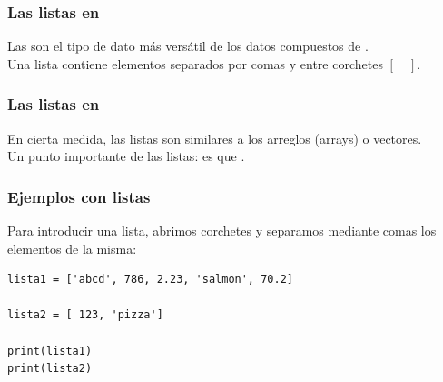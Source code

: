 \documentclass[12pt]{beamer}
\begin{document}
\begin{frame}
\frametitle{Las listas en \python}
Las  son el tipo de dato más versátil de los datos compuestos de \python.
\\
\bigskip
Una lista contiene elementos separados por comas y entre corchetes $[ \quad ]$.
\end{frame}
\begin{frame}
\frametitle{Las listas en \python}
En cierta medida, las listas son similares a los arreglos (arrays) o vectores.
\\
\bigskip
Un punto importante de las listas: \pause es que .
\end{frame}
\begin{frame}[fragile]
\frametitle{Ejemplos con listas}
Para introducir una lista, abrimos corchetes y separamos mediante comas los elementos de la misma:
\pause
\begin{lstlisting}[caption=Definiendo dos listas]
lista1 = ['abcd', 786, 2.23, 'salmon', 70.2]

lista2 = [ 123, 'pizza']

print(lista1)
print(lista2)
\end{lstlisting}
\end{frame}
\end{document}
